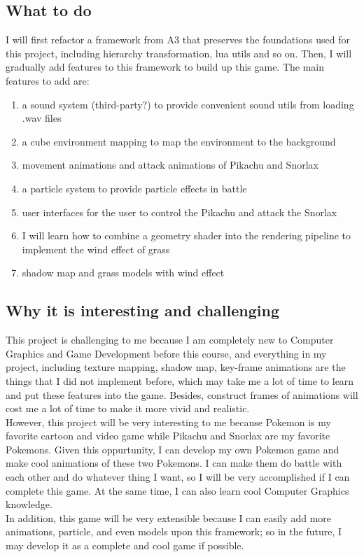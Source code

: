 \documentclass {article}
\begin{document}
    \subsection{What to do}
        I will first refactor a framework from A3 that preserves the foundations used for this project, including hierarchy transformation,
        lua utils and so on. Then, I will gradually add features to this framework to build up this game. The main features to add are:
        \begin{enumerate}
            \item a sound system (third-party?) to provide convenient sound utils from loading .wav files
            \item a cube environment mapping to map the environment to the background
            \item movement animations and attack animations of Pikachu and Snorlax
            \item a particle system to provide particle effects in battle
            \item user interfaces for the user to control the Pikachu and attack the Snorlax
            \item I will learn how to combine a geometry shader into the rendering pipeline to implement the wind effect of grass
            \item shadow map and grass models with wind effect
        \end{enumerate}

    \subsection{Why it is interesting and challenging}
        This project is challenging to me because I am completely new to Computer Graphics and Game Development before this course, and everything in my project, including
        texture mapping, shadow map, key-frame animations are the things that I did not implement before, which may take me a lot of time to learn and put these features into the game. Besides, construct frames of animations will cost me 
        a lot of time to make it more vivid and realistic.
        \\ However, this project will be very interesting to me because Pokemon is my favorite cartoon and video game while Pikachu and Snorlax are my favorite Pokemons. Given this oppurtunity, I can develop my own
        Pokemon game and make cool animations of these two Pokemons. I can make them do battle with each other and do whatever thing I want, so I will be very accomplished if I can complete this game. At the same time, I can also learn cool Computer Graphics knowledge.
        \\In addition, this game will be very extensible because I can easily add more animations, particle, and even models upon this framework; so in the future, I may develop it as a 
        complete and cool game if possible.
\end{document}
